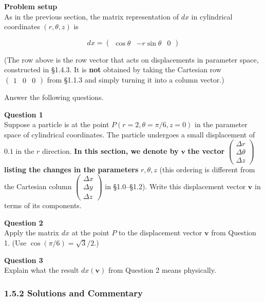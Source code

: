 \documentclass[a4paper,12pt,openany]{book}
\begin{document}
\textbf{Problem setup}\\
As in the previous section, the matrix representation of \(dx\) in
cylindrical coordinates \((r,\theta,z)\) is

\[
dx = \begin{pmatrix} \cos\theta & -r\sin\theta & 0 \end{pmatrix}
\]

(The row above is the row vector that acts on displacements in parameter
space, constructed in §1.4.3. It is \textbf{not} obtained by taking the
Cartesian row \(\begin{pmatrix}1&0&0\end{pmatrix}\) from §1.1.3 and
simply turning it into a column vector.)

Answer the following questions.

\textbf{Question 1}\\
Suppose a particle is at the point \(P(r=2,\theta=\pi/6,z=0)\) in the
parameter space of cylindrical coordinates. The particle undergoes a
small displacement of \(0.1\) in the \(r\) direction. \textbf{In this
section, we denote by} \(\mathbf{v}\) \textbf{the vector}
\(\begin{pmatrix}\Delta r\\\Delta\theta\\\Delta z\end{pmatrix}\)
\textbf{listing the changes in the parameters} \(r,\theta,z\) (this
ordering is different from the Cartesian column
\(\begin{pmatrix}\Delta x\\\Delta y\\\Delta z\end{pmatrix}\) in
§1.0–§1.2). Write this displacement vector \(\mathbf{v}\) in terms of
its components.

\textbf{Question 2}\\
Apply the matrix \(dx\) at the point \(P\) to the displacement vector
\(\mathbf{v}\) from Question 1. (Use \(\cos(\pi/6)=\sqrt{3}/2\).)

\textbf{Question 3}\\
Explain what the result \(dx(\mathbf{v})\) from Question 2 means
physically.

\hypertarget{solutions-and-commentary}{%
\subsubsection{1.5.2 Solutions and
Commentary}\label{solutions-and-commentary}}
\end{document}
